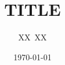 \documentclass{beamer}
\title{TITLE}
\institute{INSTITUTE}
\author{XX\ XX}
\date{\today}
\begin{document}
\begin{frame}[t]
  \begin{columns}[t]
    \begin{column}{0.5\textwidth}
      
      
      
    \end{column}
    \begin{column}{0.5\textwidth}
      
      
      
    \end{column}
  \end{columns}
\end{frame}
\end{document}
